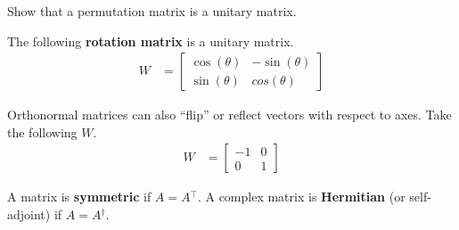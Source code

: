 \documentclass[a4paper,11pt]{exam}
\newcounter{ct}
\newcommand{\trp}{{^\top}} %
\newcommand{\ctrp}{{^\dagger}} %
\begin{document}
\begin{questions}
\question Show that a permutation matrix is a unitary matrix.

\clearpage
\question The following \textbf{rotation matrix} is a unitary matrix.
\begin{align}\label{eq:LA:rotation}
    W &=
    \begin{bmatrix}
	\cos(\theta) & -\sin(\theta)\\
	\sin(\theta) & cos(\theta)
    \end{bmatrix}
\end{align}

\question Orthonormal matrices can also ``flip'' or reflect vectors with respect to axes. Take the following $W$.
\begin{align}\label{eq:LA:flip}
    W &=
    \begin{bmatrix}
	-1 & 0\\
	 0 & 1
    \end{bmatrix}
\end{align}

A matrix is \textbf{symmetric} if $A = A\trp$. A complex matrix is \textbf{Hermitian} (or self-adjoint) if $A = A\ctrp$.


\end{questions}
\end{document}

